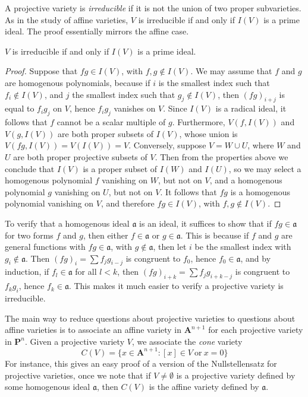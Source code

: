 A projective variety is \emph{irreducible} if it is not the union of two proper subvarieties. As in the study of affine varieties, $V$ is irreducible if and only if $I(V)$ is a prime ideal. The proof essentially mirrors the affine case.

\begin{theorem}
    $V$ is irreducible if and only if $I(V)$ is a prime ideal.
\end{theorem}
\begin{proof}
    Suppose that $fg \in I(V)$, with $f,g \not \in I(V)$. We may assume that $f$ and $g$ are homogenous polynomials, because if $i$ is the smallest index such that $f_i \not \in I(V)$, and $j$ the smallest index such that $g_j \not \in I(V)$, then $(fg)_{i + j}$ is equal to $f_ig_j$ on $V$, hence $f_ig_j$ vanishes on $V$. Since $I(V)$ is a radical ideal, it follows that $f$ cannot be a scalar multiple of $g$. Furthermore, $V(f,I(V))$ and $V(g,I(V))$ are both proper subsets of $I(V)$, whose union is $V(fg,I(V)) = V(I(V)) = V$. Conversely, suppose $V = W \cup U$, where $W$ and $U$ are both proper projective subsets of $V$. Then from the properties above we conclude that $I(V)$ is a proper subset of $I(W)$ and $I(U)$, so we may select a homogenous polynomial $f$ vanishing on $W$, but not on $V$, and a homogenous polynomial $g$ vanishing on $U$, but not on $V$. It follows that $fg$ is a homogenous polynomial vanishing on $V$, and therefore $fg \in I(V)$, with $f,g \not \in I(V)$.
\end{proof}

To verify that a homogenous ideal $\mathfrak{a}$ is an ideal, it suffices to show that if $fg \in \mathfrak{a}$ for two forms $f$ and $g$, then either $f \in \mathfrak{a}$ or $g \in \mathfrak{a}$. This is because if $f$ and $g$ are general functions with $fg \in \mathfrak{a}$, with $g \not \in \mathfrak{a}$, then let $i$ be the smallest index with $g_i \not \in \mathfrak{a}$. Then $(fg)_i = \sum f_jg_{i-j}$ is congruent to $f_0$, hence $f_0 \in \mathfrak{a}$, and by induction, if $f_l \in \mathfrak{a}$ for all $l < k$, then $(fg)_{i+k} = \sum f_jg_{i+k-j}$ is congruent to $f_kg_i$, hence $f_k \in \mathfrak{a}$. This makes it much easier to verify a projective variety is irreducible.

The main way to reduce questions about projective varieties to questions about affine varieties is to associate an affine variety in $\mathbf{A}^{n+1}$ for each projective variety in $\mathbf{P}^n$. Given a projective variety $V$, we associate the \emph{cone} variety
%
\[ C(V) = \{ x \in \mathbf{A}^{n+1}: [x] \in V\ \text{or}\ x = 0 \} \]
%
For instance, this gives an easy proof of a version of the Nullstellensatz for projective varieties, once we note that if $V \neq \emptyset$ is a projective variety defined by some homogenous ideal $\mathfrak{a}$, then $C(V)$ is the affine variety defined by $\mathfrak{a}$.

